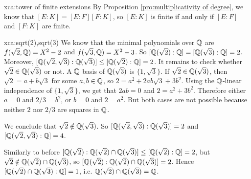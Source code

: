 \begin{sol}{xca:tower of finite extensions}
By Proposition \ref{pro:multiplicativity of degree},
we know that $[E:K]=[E:F][F:K]$, so 
$[E:K]$ is finite if and only if $[E:F]$ and $[F:K]$ are finite.
\end{sol}

\begin{sol}{xca:sqrt(2),sqrt(3)}
    We know that the minimal polynomials over $\mathbb{Q}$ are
    $f(\sqrt{2},\mathbb{Q})=X^2-2$ and $f(\sqrt{3},\mathbb{Q})=X^2-3$.
    So $[\mathbb{Q}(\sqrt{2}):\mathbb{Q}]=[\mathbb{Q}(\sqrt{3}):\mathbb{Q}]=2$.
    Moreover,
    $[\mathbb{Q}(\sqrt{2},\sqrt{3}):\mathbb{Q}(\sqrt{3})]\leq [\mathbb{Q}(\sqrt{2}):\mathbb{Q}]=2$.
    It remains to check whether $\sqrt{2}\in \mathbb{Q}(\sqrt{3})$ or not.
    A $\mathbb{Q}$ basis of $\mathbb{Q}(\sqrt{3})$ is $\{1,\sqrt{3}\}$.
    If $\sqrt{2}\in \mathbb{Q}(\sqrt{3})$, then $\sqrt{2}=a+b\sqrt{3}$ for 
    some $a,b\in\mathbb{Q}$, so $2=a^2+2ab\sqrt{3}+3b^2$.
    Using the $\mathbb{Q}$-linear independence of $\{1,\sqrt{3}\}$,
    we get that $2ab=0$ and $2=a^2+3b^2$.
    Therefore either $a=0$ and $2/3=b^2$,
    or $b=0$ and $2=a^2$.
    But both cases are not possible because neither $2$ nor $2/3$ are 
    squares in $\mathbb{Q}$.

    We conclude that $\sqrt{2}\notin\mathbb{Q}(\sqrt{3})$.
    So $[\mathbb{Q}(\sqrt{2},\sqrt{3}):\mathbb{Q}(\sqrt{3})]=2$ and
    $[\mathbb{Q}(\sqrt{2},\sqrt{3}):\mathbb{Q}]=4$.
    \begin{center}
    \end{center}
    Similarly to before 
    $[\mathbb{Q}(\sqrt{2}):\mathbb{Q}(\sqrt{2})\cap\mathbb{Q}(\sqrt{3})]\leq [\mathbb{Q}(\sqrt{2}):\mathbb{Q}]=2$,
    but $\sqrt{2}\notin\mathbb{Q}(\sqrt{2})\cap\mathbb{Q}(\sqrt{3})$, so 
    $[\mathbb{Q}(\sqrt{2}):\mathbb{Q}(\sqrt{2})\cap\mathbb{Q}(\sqrt{3})]=2$.
    Hence $[\mathbb{Q}(\sqrt{2})\cap\mathbb{Q}(\sqrt{3}):\mathbb{Q}]=1$, i.e. $\mathbb{Q}(\sqrt{2})\cap\mathbb{Q}(\sqrt{3})=\mathbb{Q}$.
\end{sol}

